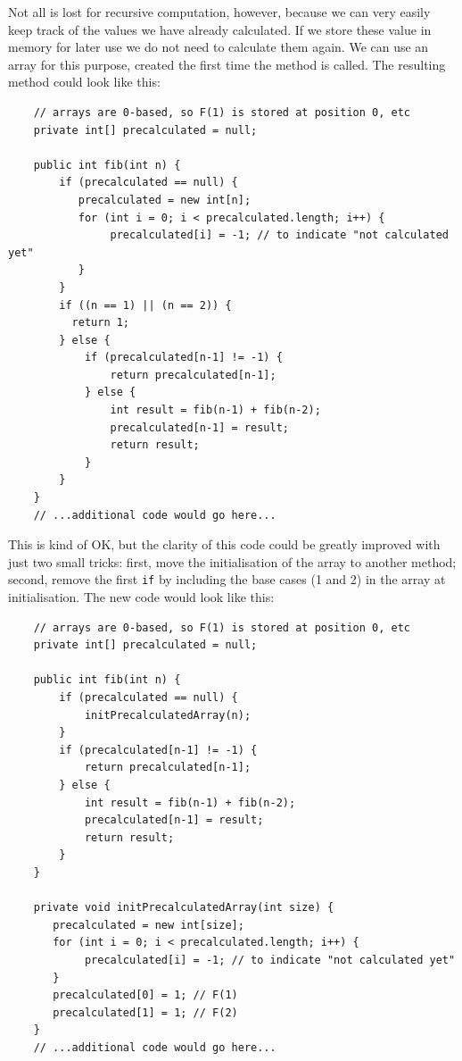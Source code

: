 Not all is lost for recursive computation, however, because we can
very easily keep track of the values we have already calculated. If we
store these value in memory for later use we do not need to calculate
them again. We can use an array for this purpose, created the first
time the method is called. The resulting method could look like this: 

\begin{verbatim}
    // arrays are 0-based, so F(1) is stored at position 0, etc
    private int[] precalculated = null;

    public int fib(int n) {
        if (precalculated == null) {
           precalculated = new int[n];
           for (int i = 0; i < precalculated.length; i++) {
                precalculated[i] = -1; // to indicate "not calculated yet"
           }
        }
        if ((n == 1) || (n == 2)) {
          return 1; 
        } else {
            if (precalculated[n-1] != -1) {
                return precalculated[n-1];
            } else {
                int result = fib(n-1) + fib(n-2);
                precalculated[n-1] = result;
                return result;
            }
        }
    }
    // ...additional code would go here...
\end{verbatim}

This is kind of OK, but the clarity of this code could be greatly
improved with just two small tricks: first, move the initialisation
of the array to another method; second, remove the first \verb+if+ by
including the base cases (1 and 2) in the array at initialisation. The
new code would look like this: 


\begin{verbatim}
    // arrays are 0-based, so F(1) is stored at position 0, etc
    private int[] precalculated = null;

    public int fib(int n) {
        if (precalculated == null) {
            initPrecalculatedArray(n);
        }
        if (precalculated[n-1] != -1) {
            return precalculated[n-1];
        } else {
            int result = fib(n-1) + fib(n-2);
            precalculated[n-1] = result;
            return result;
        }
    }

    private void initPrecalculatedArray(int size) {
       precalculated = new int[size];
       for (int i = 0; i < precalculated.length; i++) {
            precalculated[i] = -1; // to indicate "not calculated yet"
       }
       precalculated[0] = 1; // F(1)
       precalculated[1] = 1; // F(2)
    }
    // ...additional code would go here...
\end{verbatim}

